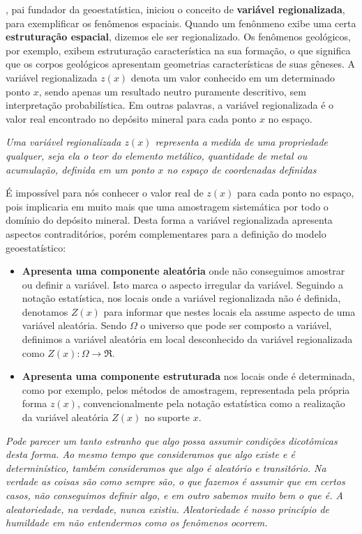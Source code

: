 \citet{matheron1963principles} , pai fundador da geoestatística, iniciou o conceito de \textbf{variável regionalizada}, para exemplificar os fenômenos espaciais. Quando um fenônmeno exibe uma certa \textbf{estruturação espacial}, dizemos ele ser regionalizado. Os fenômenos geológicos, por exemplo, exibem estruturação característica na sua formação, o que significa que os corpos geológicos apresentam geometrias características de suas gêneses. A variável regionalizada $z(x)$ denota um valor conhecido em um determinado ponto $x$, sendo apenas um resultado neutro puramente descritivo, sem interpretação probabilística. Em outras palavras, a variável regionalizada é o valor real encontrado no depósito mineral para cada ponto $x$ no espaço. 

\begin{definition}
	\textit{Uma variável regionalizada $z(x)$ representa a medida de uma propriedade qualquer, seja ela o teor do elemento metálico, quantidade de metal ou acumulação, definida em um ponto $x$ no espaço de coordenadas definidas}
\end{definition}

É impossível para nós conhecer o valor real de $z(x)$ para cada ponto no espaço, pois implicaria em muito mais que uma amostragem sistemática por todo o domínio do depósito mineral. Desta forma a variável regionalizada apresenta aspectos contraditórios, porém complementares para a definição do modelo geoestatístico:

\begin{itemize}
	\item \textbf{Apresenta uma componente aleatória} onde não conseguimos amostrar ou definir a variável. Isto marca o aspecto irregular da variável. Seguindo a notação estatística, nos locais onde a variável regionalizada não é definida, denotamos $Z(x)$ para informar que nestes locais ela assume aspecto de uma variável aleatória. Sendo $\Omega$ o universo que pode ser composto a variável, definimos a variável aleatória em local desconhecido da variável regionalizada como $Z(x):\Omega \rightarrow \Re $.
	\item \textbf{Apresenta uma componente estruturada} nos locais onde é determinada, como por exemplo, pelos métodos de amostragem, representada pela própria forma $z(x)$, convencionalmente pela notação estatística como a realização da variável aleatória $Z(x)$ no suporte $x$. 
\end{itemize}

\begin{proposition}
	\textit{Pode parecer um tanto estranho que algo possa assumir condições dicotômicas desta forma. Ao mesmo tempo que consideramos que algo existe e é determinístico, também consideramos que algo é aleatório e transitório. Na verdade as coisas são como sempre são, o que fazemos é assumir que em certos casos, não conseguimos definir algo, e em outro sabemos muito bem o que é. A aleatoriedade, na verdade, nunca existiu. Aleatoriedade é nosso princípio de humildade em não entendermos como os fenômenos ocorrem.}
\end{proposition}

